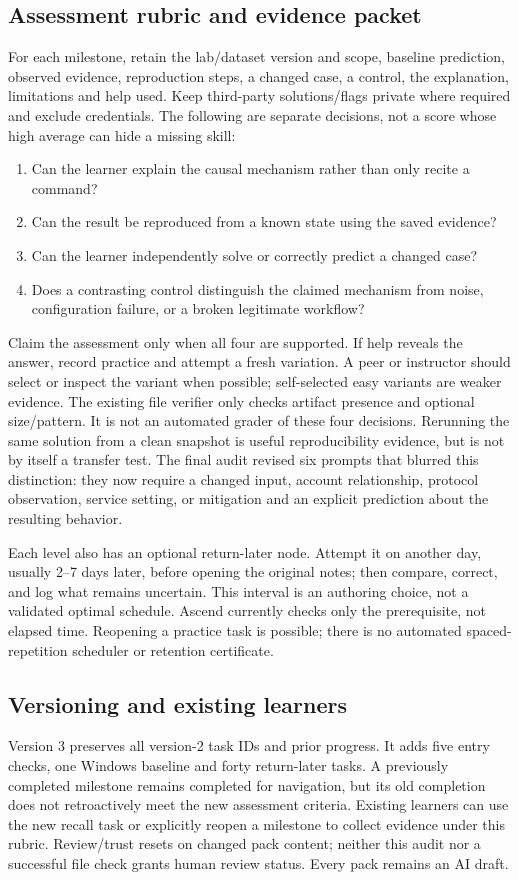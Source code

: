 \subsection{Assessment rubric and evidence packet}
For each milestone, retain the lab/dataset version and scope, baseline prediction,
observed evidence, reproduction steps, a changed case, a control, the explanation,
limitations and help used. Keep third-party solutions/flags private where required
and exclude credentials. The following are separate decisions, not a score whose
high average can hide a missing skill:
\begin{enumerate}
\item Can the learner explain the causal mechanism rather than only recite a command?
\item Can the result be reproduced from a known state using the saved evidence?
\item Can the learner independently solve or correctly predict a changed case?
\item Does a contrasting control distinguish the claimed mechanism from noise,
configuration failure, or a broken legitimate workflow?
\end{enumerate}
Claim the assessment only when all four are supported. If help reveals the answer,
record practice and attempt a fresh variation. A peer or instructor should select
or inspect the variant when possible; self-selected easy variants are weaker
evidence. The existing file verifier only checks artifact presence and optional
size/pattern. It is not an automated grader of these four decisions.
Rerunning the same solution from a clean snapshot is useful reproducibility
evidence, but is not by itself a transfer test. The final audit revised six
prompts that blurred this distinction: they now require a changed input, account
relationship, protocol observation, service setting, or mitigation and an explicit
prediction about the resulting behavior.

Each level also has an optional return-later node. Attempt it on another day,
usually 2--7 days later, before opening the original notes; then compare, correct,
and log what remains uncertain. This interval is an authoring choice, not a
validated optimal schedule. Ascend currently checks only the prerequisite,
not elapsed time. Reopening a practice task is possible; there is no automated
spaced-repetition scheduler or retention certificate.

\subsection{Versioning and existing learners}
Version 3 preserves all version-2 task IDs and prior progress. It adds five entry
checks, one Windows baseline and forty return-later tasks. A previously completed
milestone remains completed for navigation, but its old completion does not
retroactively meet the new assessment criteria. Existing learners can use the
new recall task or explicitly reopen a milestone to collect evidence under this
rubric. Review/trust resets on changed pack content; neither this audit nor a
successful file check grants human review status. Every pack remains an AI draft.

